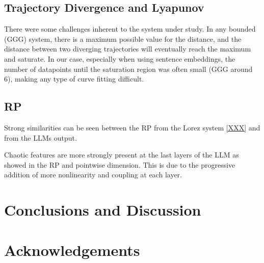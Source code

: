 \documentclass[a4paper,12pt]{article}
\begin{document}
\subsection{Trajectory Divergence and Lyapunov} %

There were some challenges inherent to the system under study. In any bounded (GGG) system, there is a maximum possible value for the distance, and the distance between two diverging trajectories will eventually reach the maximum and saturate. In our case, especially when using sentence embeddings, the number of datapoints until the saturation region was often small (GGG around 6), making any type of curve fitting difficult.

\subsection{RP}

Strong similarities can be seen between the RP from the Lorez system \ref{XXX} and from the LLMs output.


Chaotic features are more strongly present at the last layers of the LLM as showed in the RP and pointwise dimension. This is due to the progressive addition of more nonlinearity and coupling at each layer. 


\section{Conclusions and Discussion}




\section{Acknowledgements }
\end{document}
